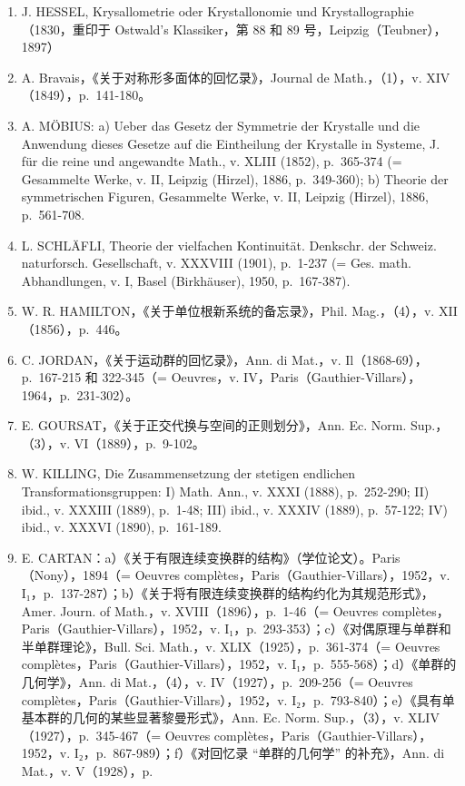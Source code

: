 \begin{enumerate}
\def\labelenumi{(\Roman{enumi})}
\item
  J. HESSEL, Krysallometrie oder Krystallonomie und Krystallographie（1830，重印于 Ostwald's Klassiker，第 88 和 89 号，Leipzig（Teubner），1897）
\item
  A. Bravais，《关于对称形多面体的回忆录》，Journal de Math.，（1），v. XIV（1849），p.~141-180。
\item
  A. MÖBIUS: a) Ueber das Gesetz der Symmetrie der Krystalle und die Anwendung dieses Gesetze auf die Eintheilung der Krystalle in Systeme, J. für die reine und angewandte Math., v. XLIII (1852), p.~365-374 (= Gesammelte Werke, v. II, Leipzig (Hirzel), 1886, p.~349-360); b) Theorie der symmetrischen Figuren, Gesammelte Werke, v. II, Leipzig (Hirzel), 1886, p.~561-708.
\item
  L. SCHLÄFLI, Theorie der vielfachen Kontinuität. Denkschr. der Schweiz. naturforsch. Gesellschaft, v. XXXVIII (1901), p.~1-237 (= Ges. math. Abhandlungen, v. I, Basel (Birkhäuser), 1950, p.~167-387).
\item
  W. R. HAMILTON，《关于单位根新系统的备忘录》，Phil. Mag.，（4），v. XII（1856），p.~446。
\item
  C. JORDAN，《关于运动群的回忆录》，Ann. di Mat.，v. Il（1868-69），p.~167-215 和 322-345（= Oeuvres，v. IV，Paris（Gauthier-Villars），1964，p.~231-302）。
\item
  E. GOURSAT，《关于正交代换与空间的正则划分》，Ann. Ec. Norm. Sup.，（3），v. VI（1889），p.~9-102。
\item
  W. KILLING, Die Zusammensetzung der stetigen endlichen Transformationsgruppen: I) Math. Ann., v. XXXI (1888), p.~252-290; II) ibid., v. XXXIII (1889), p.~1-48; III) ibid., v. XXXIV (1889), p.~57-122; IV) ibid., v. XXXVI (1890), p.~161-189.
\item
  E. CARTAN：a）《关于有限连续变换群的结构》（学位论文）。Paris（Nony），1894（= Oeuvres complètes，Paris（Gauthier-Villars），1952，v. I₁，p.~137-287）；b）《关于将有限连续变换群的结构约化为其规范形式》，Amer. Journ. of Math.，v. XVIII（1896），p.~1-46（= Oeuvres complètes，Paris（Gauthier-Villars），1952，v. I₁，p.~293-353）；c）《对偶原理与单群和半单群理论》，Bull. Sci. Math.，v. XLIX（1925），p.~361-374（= Oeuvres complètes，Paris（Gauthier-Villars），1952，v. I₁，p.~555-568）；d）《单群的几何学》，Ann. di Mat.，（4），v. IV（1927），p.~209-256（= Oeuvres complètes，Paris（Gauthier-Villars），1952，v. I₂，p.~793-840）；e）《具有单基本群的几何的某些显著黎曼形式》，Ann. Ec. Norm. Sup.，（3），v. XLIV（1927），p.~345-467（= Oeuvres complètes，Paris（Gauthier-Villars），1952，v. I₂，p.~867-989）；f）《对回忆录 ``单群的几何学'' 的补充》，Ann. di Mat.，v. V（1928），p.
\end{enumerate}

